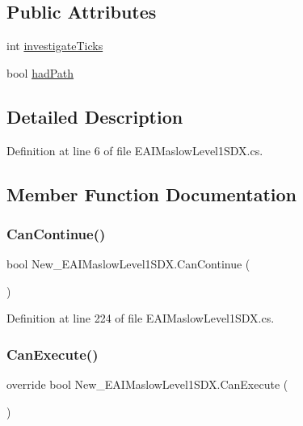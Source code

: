 \subsection*{Public Attributes}
\begin{DoxyCompactItemize}
\item 
int \mbox{\hyperlink{class_new___e_a_i_maslow_level1_s_d_x_a046aad8382c146040b94a68c5d7cf1db}{investigate\+Ticks}}
\item 
bool \mbox{\hyperlink{class_new___e_a_i_maslow_level1_s_d_x_a680771f4c1961b58edd3ca675dec0a55}{had\+Path}}
\end{DoxyCompactItemize}


\subsection{Detailed Description}


Definition at line 6 of file E\+A\+I\+Maslow\+Level1\+S\+D\+X.\+cs.



\subsection{Member Function Documentation}
\mbox{\label{class_new___e_a_i_maslow_level1_s_d_x_a8146c0524043632403c458d4a00b4ac3}} 
\subsubsection{\texorpdfstring{CanContinue()}{CanContinue()}}
{\footnotesize\ttfamily bool New\+\_\+\+E\+A\+I\+Maslow\+Level1\+S\+D\+X.\+Can\+Continue (\begin{DoxyParamCaption}{ }\end{DoxyParamCaption})}



Definition at line 224 of file E\+A\+I\+Maslow\+Level1\+S\+D\+X.\+cs.

\mbox{\label{class_new___e_a_i_maslow_level1_s_d_x_ad3d6580ec493e461862c2bda9a363bda}} 
\subsubsection{\texorpdfstring{CanExecute()}{CanExecute()}}
{\footnotesize\ttfamily override bool New\+\_\+\+E\+A\+I\+Maslow\+Level1\+S\+D\+X.\+Can\+Execute (\begin{DoxyParamCaption}{ }\end{DoxyParamCaption})}



